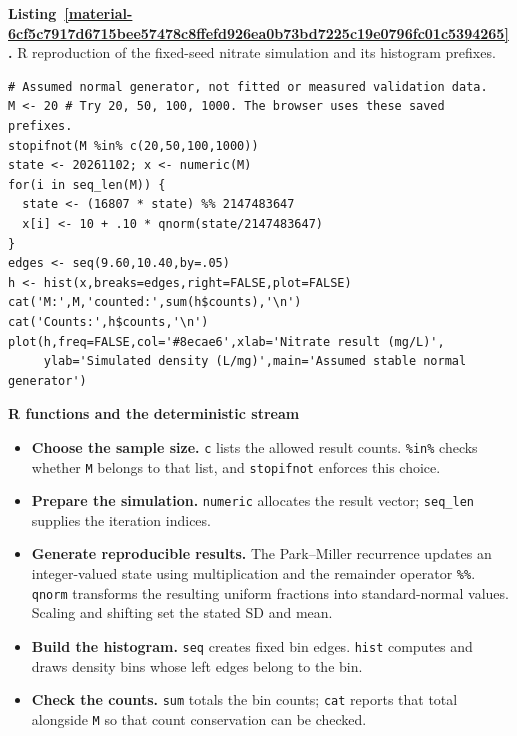 \documentclass[11pt,a4paper]{article}
\newcounter{listing}
\begin{document}
\par\medskip
{}
\label{material-6cf5c7917d6715bee57478c8ffefd926ea0b73bd7225c19e0796fc01c5394265}
\noindent\textbf{Listing~\ref*{material-6cf5c7917d6715bee57478c8ffefd926ea0b73bd7225c19e0796fc01c5394265}.} R reproduction of the fixed-seed nitrate simulation and its histogram prefixes.\par\nopagebreak
\begin{Verbatim}[fontsize=\footnotesize,breaklines=true,breakanywhere=true]
# Assumed normal generator, not fitted or measured validation data.
M <- 20 # Try 20, 50, 100, 1000. The browser uses these saved prefixes.
stopifnot(M %in% c(20,50,100,1000))
state <- 20261102; x <- numeric(M)
for(i in seq_len(M)) {
  state <- (16807 * state) %% 2147483647
  x[i] <- 10 + .10 * qnorm(state/2147483647)
}
edges <- seq(9.60,10.40,by=.05)
h <- hist(x,breaks=edges,right=FALSE,plot=FALSE)
cat('M:',M,'counted:',sum(h$counts),'\n')
cat('Counts:',h$counts,'\n')
plot(h,freq=FALSE,col='#8ecae6',xlab='Nitrate result (mg/L)',
     ylab='Simulated density (L/mg)',main='Assumed stable normal generator')

\end{Verbatim}

\par\noindent\textbf{R functions and the deterministic stream}

\begin{itemize}\setlength{\itemsep}{1pt}\setlength{\parsep}{0pt}
\item \textbf{Choose the sample size.} \texttt{c} lists the allowed result counts. \texttt{\%in\%} checks whether \texttt{M} belongs to that list, and \texttt{stopifnot} enforces this choice.
\item \textbf{Prepare the simulation.} \texttt{numeric} allocates the result vector; \texttt{seq\_len} supplies the iteration indices.
\item \textbf{Generate reproducible results.} The Park–Miller recurrence updates an integer-valued state using multiplication and the remainder operator \texttt{\%\%}. \texttt{qnorm} transforms the resulting uniform fractions into standard-normal values. Scaling and shifting set the stated SD and mean.
\item \textbf{Build the histogram.} \texttt{seq} creates fixed bin edges. \texttt{hist} computes and draws density bins whose left edges belong to the bin.
\item \textbf{Check the counts.} \texttt{sum} totals the bin counts; \texttt{cat} reports that total alongside \texttt{M} so that count conservation can be checked.
\end{itemize}
\end{document}
